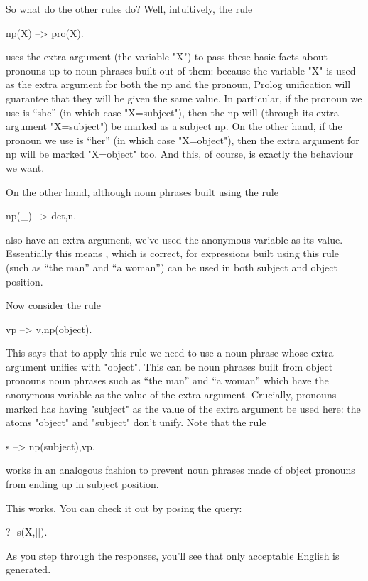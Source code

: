 So what do the other rules do? Well, intuitively, the rule
\begin{LPNcodedisplay}
np(X) --> pro(X).
\end{LPNcodedisplay}
uses the extra argument (the variable "X") to pass these basic facts
about pronouns up to noun phrases built out of them: because the
variable "X" is used as the extra argument for both the np and the
pronoun, Prolog unification will guarantee that they will be given the
same value. In particular, if the pronoun we use is ``she'' (in which
case "X=subject"), then the np will (through its extra argument
"X=subject") be marked as a subject np. On the other hand, if the
pronoun we use is ``her'' (in which case "X=object"), then the extra
argument for np will be marked "X=object" too. And this, of course, is
exactly the behaviour we want.

On the other hand, although noun phrases built using the rule
\begin{LPNcodedisplay}
np(_) --> det,n.
\end{LPNcodedisplay}
also have an extra argument, we've used the anonymous variable as its
value.  Essentially this means , which is
correct, for expressions built using this rule (such as ``the man''
and ``a woman'') can be used in both subject and object position.

Now consider the rule
\begin{LPNcodedisplay}
vp --> v,np(object).
\end{LPNcodedisplay}
This says that to apply this rule we need to use a noun phrase whose
extra argument unifies with "object".  This can be 
noun phrases built from object pronouns  noun phrases such as
``the man'' and ``a woman'' which have the anonymous variable as the
value of the extra argument.  Crucially, pronouns marked has having
"subject" as the value of the extra argument  be used
here: the atoms "object" and "subject" don't unify.  Note
that the rule
\begin{LPNcodedisplay}
s --> np(subject),vp.
\end{LPNcodedisplay}
works in an analogous fashion to prevent noun phrases made of object
pronouns from ending up in subject position.

This works.  You can check it out by posing the query:
\begin{LPNcodedisplay}
?- s(X,[]).
\end{LPNcodedisplay}
As you step through the responses, you'll see that only acceptable
English is generated.

